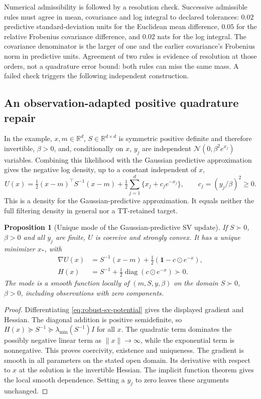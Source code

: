 \documentclass[11pt]{article}
\newtheorem{proposition}{Proposition}
\begin{document}
Numerical admissibility is followed by a resolution check. Successive
admissible rules must agree in mean, covariance and log integral to declared
tolerances: $0.02$ predictive standard-deviation units for the Euclidean
mean difference, $0.05$ for the relative Frobenius covariance difference,
and $0.02$ nats for the log integral. The covariance denominator is the
larger of one and the earlier covariance's Frobenius norm in predictive
units. Agreement of two rules is evidence of resolution at those orders,
not a quadrature error bound: both rules can miss the same mass. A failed
check triggers the following independent construction.

\subsection{An observation-adapted positive quadrature repair}

In the example, $x,m\in\mathbb R^d$, $S\in\mathbb R^{d\times d}$ is
symmetric positive definite and therefore invertible, $\beta>0$, and,
conditionally on $x$,
$y_j$ are independent $\mathcal N(0,\beta^2 e^{x_j})$ variables. Combining
this likelihood with the Gaussian predictive approximation gives the
negative log density, up to a constant independent of $x$,
\begin{equation}
 U(x)=\tfrac12(x-m)^\top S^{-1}(x-m)
       +\tfrac12\sum_{j=1}^d\{x_j+c_j e^{-x_j}\},
 \qquad c_j=(y_j/\beta)^2\ge0 .
 \label{eq:robust-sv-potential}
\end{equation}
This is a density for the Gaussian-predictive approximation. It equals
neither the full filtering density in general nor a TT-retained target.

\begin{proposition}[Unique mode of the Gaussian-predictive SV update]
\label{prop:robust-mode}
If $S\succ0$, $\beta>0$ and all $y_j$ are finite, $U$ is coercive and
strongly convex. It has a unique minimizer $x_*$, with
\begin{align}
 \nabla U(x)&=S^{-1}(x-m)+\tfrac12(\boldsymbol1-c\odot e^{-x}),
 \nonumber\\
 H(x)&=S^{-1}+\tfrac12\operatorname{diag}(c\odot e^{-x})\succ0 .
 \label{eq:robust-mode-derivatives}
\end{align}
The mode is a smooth function locally of $(m,S,y,\beta)$ on the domain
$S\succ0$, $\beta>0$, including observations with zero components.
\end{proposition}
\begin{proof}
Differentiating \eqref{eq:robust-sv-potential} gives the displayed gradient
and Hessian. The diagonal addition is positive semidefinite, so
$H(x)\succeq S^{-1}\succeq\lambda_{\min}(S^{-1})I$ for all $x$.
The quadratic term dominates the possibly negative linear term as
$\|x\|\to\infty$, while the exponential term is nonnegative. This
proves coercivity, existence and uniqueness. The gradient is smooth in all
parameters on the stated open domain. Its derivative with respect to $x$
at the solution is the invertible Hessian. The implicit function theorem
gives the local smooth dependence. Setting a $y_j$ to zero leaves these
arguments unchanged.
\end{proof}
\end{document}

